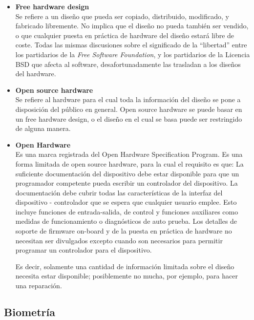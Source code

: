 \begin{itemize}
\item \textbf{Free hardware design}\\
Se refiere a un diseño que pueda ser copiado, distribuido, modificado, y fabricado libremente. No implica que el diseño no pueda también ser vendido, o que cualquier puesta en práctica de hardware del diseño estará libre de coste. Todas las mismas discusiones sobre el significado de la ``libertad'' entre los partidarios de la \emph{Free Software Foundation}, y los partidarios de la Licencia BSD que afecta al software, desafortunadamente las trasladan a los diseños del hardware.\\
\item \textbf{Open source hardware}\\
Se refiere al hardware para el cual toda la información del diseño se pone a disposición del público en general. Open source hardware se puede basar en un free hardware design, o el diseño en el cual se basa puede ser restringido de alguna manera.\\
\item \textbf{Open Hardware}\\
Es una marca registrada del Open Hardware Specification Program. Es una forma limitada de open source hardware, para la cual el requisito es que: La suficiente documentación del dispositivo debe estar disponible para que un programador competente pueda escribir un controlador del dispositivo. La documentación debe cubrir todas las características de la interfaz del dispositivo - controlador que se espera que cualquier usuario emplee. Esto incluye funciones de entrada-salida, de control y funciones auxiliares como medidas de funcionamiento o diagnósticos de auto prueba. Los detalles de soporte de firmware on-board y de la puesta en práctica de hardware no necesitan ser divulgados excepto cuando son necesarios para permitir programar un controlador para el dispositivo.\cite{Del07}

Es decir, solamente una cantidad de información limitada sobre el diseño necesita estar disponible; posiblemente no mucha, por ejemplo, para hacer una reparación.

\end{itemize}




\subsection{Biometría}

